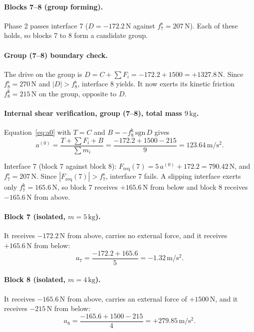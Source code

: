 \documentclass[11pt,a4paper]{article}
\begin{document}
\paragraph{Blocks 7--8 (group forming).} Phase 2 passes interface 7 ($D=-172.2\,\mathrm{N}$ against $f^{\mathrm s}_{7}=207\,\mathrm{N}$). Each of these holds, so blocks 7 to 8 form a candidate group.

\paragraph{Group (7--8) boundary check.} The drive on the group is $D=C+\sum F_i=-172.2 + 1500=+1327.8\,\mathrm{N}$. Since $f^{\mathrm s}_{8}=270\,\mathrm{N}$ and $|D|>f^{\mathrm s}_{8}$, interface 8 yields. It now exerts its kinetic friction $f^{\mathrm k}_{8}=215\,\mathrm{N}$ on the group, opposite to $D$.

\paragraph{Internal shear verification, group (7--8), total mass $9\,\mathrm{kg}$.} Equation~\eqref{eq:a0} with $T=C$ and $B=-f^{\mathrm k}_{8}\,\mathrm{sgn}\,D$ gives\[a^{(0)}=\dfrac{T+\sum F_i+B}{\sum m_i}=\dfrac{-172.2 + 1500 - 215}{9}=123.64\,\mathrm{m/s^2}.\]

Interface 7 (block 7 against block 8): $F_{\mathrm{req}}(7)=5\,a^{(0)} + 172.2=790.42\,\mathrm{N}$, and $f^{\mathrm s}_{7}=207\,\mathrm{N}$. Since $|F_{\mathrm{req}}(7)|>f^{\mathrm s}_{7}$, interface 7 fails. A slipping interface exerts only $f^{\mathrm k}_{7}=165.6\,\mathrm{N}$, so block 7 receives $+165.6\,\mathrm{N}$ from below and block 8 receives $-165.6\,\mathrm{N}$ from above.

\paragraph{Block 7 (isolated, $m=5\,\mathrm{kg}$).} It receives $-172.2\,\mathrm{N}$ from above, carries no external force, and it receives $+165.6\,\mathrm{N}$ from below:\[a_{7}=\dfrac{-172.2 + 165.6}{5}=-1.32\,\mathrm{m/s^2}.\]

\paragraph{Block 8 (isolated, $m=4\,\mathrm{kg}$).} It receives $-165.6\,\mathrm{N}$ from above, carries an external force of $+1500\,\mathrm{N}$, and it receives $-215\,\mathrm{N}$ from below:\[a_{8}=\dfrac{-165.6 + 1500 - 215}{4}=+279.85\,\mathrm{m/s^2}.\]
\end{document}
